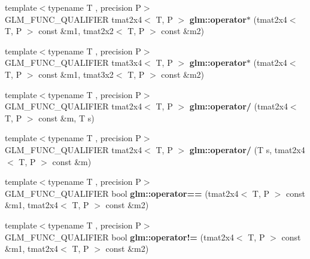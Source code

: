 \begin{DoxyCompactItemize}
\item 
\hypertarget{namespaceglm_a6e95f7bb50c470a281e61d84895675d4}{{\footnotesize template$<$typename T , precision P$>$ }\\G\-L\-M\-\_\-\-F\-U\-N\-C\-\_\-\-Q\-U\-A\-L\-I\-F\-I\-E\-R tmat2x4$<$ T, P $>$ {\bfseries glm\-::operator$\ast$} (tmat2x4$<$ T, P $>$ const \&m1, tmat2x2$<$ T, P $>$ const \&m2)}\label{namespaceglm_a6e95f7bb50c470a281e61d84895675d4}

\item 
\hypertarget{namespaceglm_a74224d12bdf4aebfe9005cf41e80ef7c}{{\footnotesize template$<$typename T , precision P$>$ }\\G\-L\-M\-\_\-\-F\-U\-N\-C\-\_\-\-Q\-U\-A\-L\-I\-F\-I\-E\-R tmat3x4$<$ T, P $>$ {\bfseries glm\-::operator$\ast$} (tmat2x4$<$ T, P $>$ const \&m1, tmat3x2$<$ T, P $>$ const \&m2)}\label{namespaceglm_a74224d12bdf4aebfe9005cf41e80ef7c}

\item 
\hypertarget{namespaceglm_a078ecb1b9db9902dc87f37dc86a56f38}{{\footnotesize template$<$typename T , precision P$>$ }\\G\-L\-M\-\_\-\-F\-U\-N\-C\-\_\-\-Q\-U\-A\-L\-I\-F\-I\-E\-R tmat2x4$<$ T, P $>$ {\bfseries glm\-::operator/} (tmat2x4$<$ T, P $>$ const \&m, T s)}\label{namespaceglm_a078ecb1b9db9902dc87f37dc86a56f38}

\item 
\hypertarget{namespaceglm_ad762e815816d483608530235166df211}{{\footnotesize template$<$typename T , precision P$>$ }\\G\-L\-M\-\_\-\-F\-U\-N\-C\-\_\-\-Q\-U\-A\-L\-I\-F\-I\-E\-R tmat2x4$<$ T, P $>$ {\bfseries glm\-::operator/} (T s, tmat2x4$<$ T, P $>$ const \&m)}\label{namespaceglm_ad762e815816d483608530235166df211}

\item 
\hypertarget{namespaceglm_acf9efbc338894088f7ca5419c6a0cf81}{{\footnotesize template$<$typename T , precision P$>$ }\\G\-L\-M\-\_\-\-F\-U\-N\-C\-\_\-\-Q\-U\-A\-L\-I\-F\-I\-E\-R bool {\bfseries glm\-::operator==} (tmat2x4$<$ T, P $>$ const \&m1, tmat2x4$<$ T, P $>$ const \&m2)}\label{namespaceglm_acf9efbc338894088f7ca5419c6a0cf81}

\item 
\hypertarget{namespaceglm_a979ffc34e33d3dd7ca8375b30c021384}{{\footnotesize template$<$typename T , precision P$>$ }\\G\-L\-M\-\_\-\-F\-U\-N\-C\-\_\-\-Q\-U\-A\-L\-I\-F\-I\-E\-R bool {\bfseries glm\-::operator!=} (tmat2x4$<$ T, P $>$ const \&m1, tmat2x4$<$ T, P $>$ const \&m2)}\label{namespaceglm_a979ffc34e33d3dd7ca8375b30c021384}

\end{DoxyCompactItemize}


